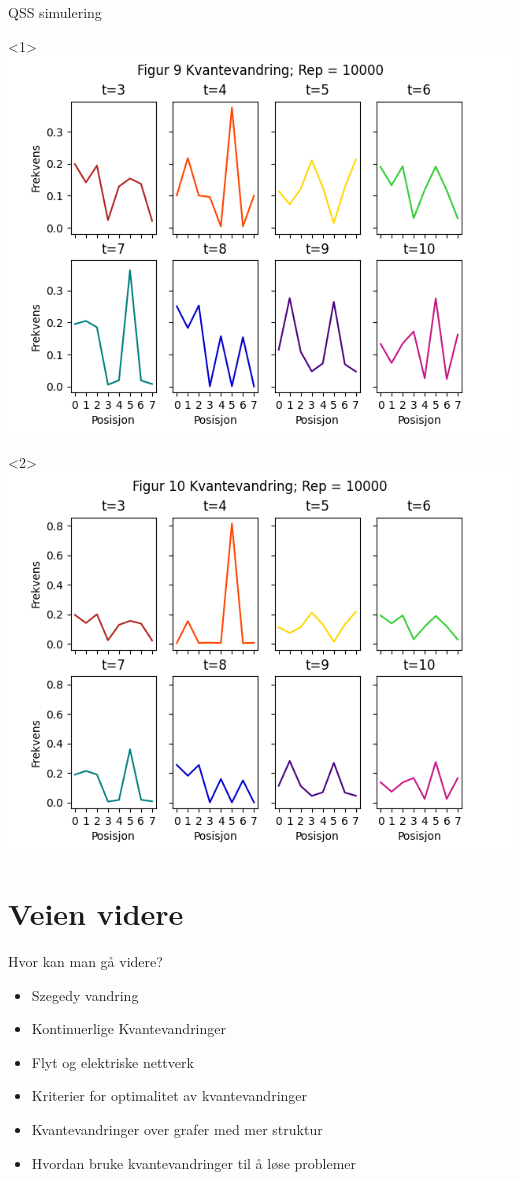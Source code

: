 \documentclass[norsk]{beamer}
\begin{document}
	\begin{frame}{QSS simulering}
			\begin{onlyenv}<1>
				\includegraphics[scale = 0.5]	{Fig10QSS.png}
			\end{onlyenv}
			\begin{onlyenv}<2>
				\includegraphics[scale = 0.5]	{Fig10QSSAmp.png}
			\end{onlyenv}
	\end{frame}

\section{Veien videre}

	\begin{frame}{Hvor kan man gå videre?}
		\begin{itemize}
			\item Szegedy vandring
			\item Kontinuerlige Kvantevandringer
			\item Flyt og elektriske nettverk
			\item Kriterier for optimalitet av kvantevandringer
			\item Kvantevandringer over grafer med mer struktur
			\item Hvordan bruke kvantevandringer til å løse problemer
		\end{itemize}
	\end{frame}
\end{document}
